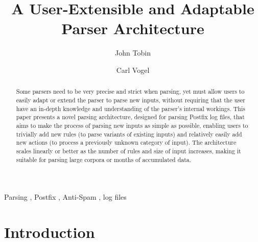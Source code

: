 \documentclass[preprint,draft,numbers,1p]{elsarticle}
\begin{document}
\begin{frontmatter}

\title{A User-Extensible and Adaptable Parser Architecture}
\author{John Tobin}
\author{Carl Vogel}
\address{School of Computer Science and Statistics, Trinity College, Dublin
2, Ireland.}
\address{Supported by Science Foundation Ireland RFP 05/RF/CMS002.}

\begin{keyword}
    Parsing \sep{} Postfix \sep{} Anti-Spam \sep{} log files
\end{keyword}

\begin{abstract}
    Some parsers need to be very precise and strict when parsing, yet must
    allow users to easily adapt or extend the parser to parse new inputs,
    without requiring that the user have an in-depth knowledge and
    understanding of the parser's internal workings.  This paper presents a
    novel parsing architecture, designed for parsing Postfix log files,
    that aims to make the process of parsing new inputs as simple as
    possible, enabling users to trivially add new rules (to parse variants
    of existing inputs) and relatively easily add new actions (to process a
    previously unknown category of input).  The architecture scales
    linearly or better as the number of rules and size of input increases,
    making it suitable for parsing large corpora or months of accumulated
    data.
\end{abstract}

\end{frontmatter}



\section{Introduction}

\label{Introduction}
\end{document}
